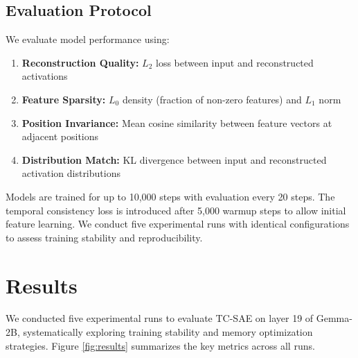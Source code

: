 \documentclass{article} %
\begin{document}
\subsection{Evaluation Protocol}
We evaluate model performance using:
\begin{enumerate}
    \item \textbf{Reconstruction Quality:} $L_2$ loss between input and reconstructed activations
    \item \textbf{Feature Sparsity:} $L_0$ density (fraction of non-zero features) and $L_1$ norm
    \item \textbf{Position Invariance:} Mean cosine similarity between feature vectors at adjacent positions
    \item \textbf{Distribution Match:} KL divergence between input and reconstructed activation distributions
\end{enumerate}

Models are trained for up to 10,000 steps with evaluation every 20 steps. The temporal consistency loss is introduced after 5,000 warmup steps to allow initial feature learning. We conduct five experimental runs with identical configurations to assess training stability and reproducibility.

\section{Results}
\label{sec:results}

We conducted five experimental runs to evaluate TC-SAE on layer 19 of Gemma-2B, systematically exploring training stability and memory optimization strategies. Figure \ref{fig:results} summarizes the key metrics across all runs.
\end{document}
